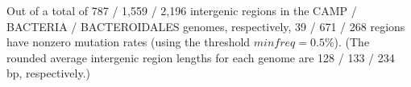 Out of a total of 787 / 1,559 / 2,196 intergenic regions in the CAMP / BACTERIA / BACTEROIDALES genomes, respectively, 39 / 671 / 268 regions have nonzero mutation rates (using the threshold $minfreq=0.5\%$). (The rounded average intergenic region lengths for each genome are 128 / 133 / 234 bp, respectively.)\endinput